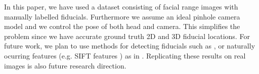 \documentclass[runningheads]{llncs}
\begin{document}
In this paper, we have used a dataset consisting of facial range images with manually labelled fiducials.    
Furthermore we assume an ideal pinhole camera model and we control the pose of both head and camera.  
This simplifies the problem since we have accurate ground truth 2D and 3D fiducial locations. 
For future work, we plan to use methods for detecting fiducials such as \cite{belhumeur2011localizing}, or naturally ocurring features (e.g. SIFT features \cite{lowe}) as in \cite{ohayon2006robust}.
Replicating these results on real images is also future research direction.




\end{document}

